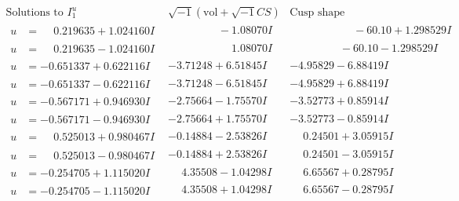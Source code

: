 \documentclass[1p]{elsarticle_modified}
\theoremstyle{definition}
\newcommand{\I}{\sqrt{-1}}
\begin{document}
$$\begin{array}{c|c|c}  
\text{Solutions to }I^u_{1}& \I (\text{vol} + \sqrt{-1}CS) & \text{Cusp shape}\\
 \hline 
\begin{aligned}
u &= \phantom{-}0.219635 + 1.024160 I\end{aligned}
 & \phantom{-0.000000 } -1.08070 I & \phantom{-0.000000 -}     -6
0. 10   + 1.298529 I \\ \hline\begin{aligned}
u &= \phantom{-}0.219635 - 1.024160 I\end{aligned}
 & \phantom{-0.000000 -}1.08070 I & \phantom{-0.000000 }      -6
0. 10   - 1.298529 I \\ \hline\begin{aligned}
u &= -0.651337 + 0.622116 I\end{aligned}
 & -3.71248 + 6.51845 I & -4.95829 - 6.88419 I \\ \hline\begin{aligned}
u &= -0.651337 - 0.622116 I\end{aligned}
 & -3.71248 - 6.51845 I & -4.95829 + 6.88419 I \\ \hline\begin{aligned}
u &= -0.567171 + 0.946930 I\end{aligned}
 & -2.75664 - 1.75570 I & -3.52773 + 0.85914 I \\ \hline\begin{aligned}
u &= -0.567171 - 0.946930 I\end{aligned}
 & -2.75664 + 1.75570 I & -3.52773 - 0.85914 I \\ \hline\begin{aligned}
u &= \phantom{-}0.525013 + 0.980467 I\end{aligned}
 & -0.14884 - 2.53826 I & \phantom{-}0.24501 + 3.05915 I \\ \hline\begin{aligned}
u &= \phantom{-}0.525013 - 0.980467 I\end{aligned}
 & -0.14884 + 2.53826 I & \phantom{-}0.24501 - 3.05915 I \\ \hline\begin{aligned}
u &= -0.254705 + 1.115020 I\end{aligned}
 & \phantom{-}4.35508 - 1.04298 I & \phantom{-}6.65567 + 0.28795 I \\ \hline\begin{aligned}
u &= -0.254705 - 1.115020 I\end{aligned}
 & \phantom{-}4.35508 + 1.04298 I & \phantom{-}6.65567 - 0.28795 I \\ \hline\begin{aligned}

\end{aligned}
\end{array}$$
\end{document}
